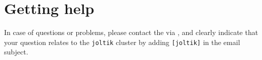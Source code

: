 





\section{Getting help}
\label{sec:gpu_ugent_help}

In case of questions or problems, please contact the \hpcTeam via \hpcinfo, and clearly indicate that your question
relates to the \lstinline|joltik| cluster by adding \lstinline|[joltik]| in the email subject.
